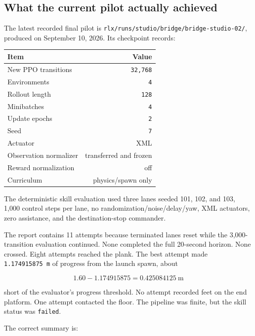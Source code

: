 \documentclass[
  american,
  11pt,
  letterpaper,
]{article}
\newcounter{none} %
\begin{document}
\subsection{What the current pilot actually
achieved}\label{what-the-current-pilot-actually-achieved}

The latest recorded final pilot is
\texttt{rlx/\allowbreak{}runs/\allowbreak{}studio/\allowbreak{}bridge/\allowbreak{}bridge-\allowbreak{}studio-\allowbreak{}02/\allowbreak{}},
produced on September 10, 2026. Its checkpoint records:

{\def\LTcaptype{none} %
\begin{longtable}[]{@{}lr@{}}
\toprule\noalign{}
Item & Value \\
\midrule\noalign{}
\endhead
\bottomrule\noalign{}
\endlastfoot
New PPO transitions & \texttt{32,768} \\
Environments & \texttt{4} \\
Rollout length & \texttt{128} \\
Minibatches & \texttt{4} \\
Update epochs & \texttt{2} \\
Seed & \texttt{7} \\
Actuator & XML \\
Observation normalizer & transferred and frozen \\
Reward normalization & off \\
Curriculum & physics/spawn only \\
\end{longtable}
}

The deterministic skill evaluation used three lanes seeded 101, 102, and
103, 1,000 control steps per lane, no randomization/noise/delay/yaw, XML
actuators, zero assistance, and the destination-stop commander.

The report contains 11 attempts because terminated lanes reset while the
3,000-transition evaluation continued. None completed the full 20-second
horizon. None crossed. Eight attempts reached the plank. The best
attempt made \texttt{1.174915875\ m} of progress from the launch spawn,
about

\[
1.60-1.174915875=0.425084125\ \text{m}
\]

short of the evaluator's progress threshold. No attempt recorded feet on
the end platform. One attempt contacted the floor. The pipeline was
finite, but the skill status was \texttt{failed}.

The correct summary is:
\end{document}
